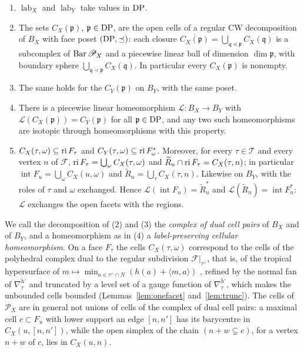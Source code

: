 \begin{proposition}\label{prop:L1}
\begin{enumerate}
\item $\operatorname{lab}_X$ and $\operatorname{lab}_Y$ take values in $\mathrm{DP}$.
\item The sets $C_X({\mathfrak p})$, ${\mathfrak p}\in\mathrm{DP}$, are the open cells of a regular CW decomposition of $B_X$ with face poset
$(\mathrm{DP},\preceq)$: each closure $\overline{C_X({\mathfrak p})}=\bigcup_{{\mathfrak q}\preceq {\mathfrak p}}C_X({\mathfrak q})$ is a subcomplex of $\operatorname{Bar}\mathscr P_X$ and a
piecewise linear ball of dimension $\dim{\mathfrak p}$, with boundary sphere $\bigcup_{{\mathfrak q}\prec {\mathfrak p}}C_X({\mathfrak q})$. In particular every $C_X({\mathfrak p})$ is
nonempty.
\item The same holds for the $C_Y({\mathfrak p})$ on $B_Y$, with the same poset.
\item There is a piecewise linear homeomorphism $\mathcal L\colon B_X\to B_Y$ with $\mathcal L(C_X({\mathfrak p}))=C_Y({\mathfrak p})$ for all
${\mathfrak p}\in\mathrm{DP}$, and any two such homeomorphisms are isotopic through homeomorphisms with this property.
\item $C_X(\tau,\omega)\subseteq\operatorname{ri} F_\tau$ and $C_Y(\tau,\omega)\subseteq\operatorname{ri} F^*_\omega$. Moreover, for every
$\tau\in\mathcal T$ and every vertex $n$ of $\mathcal F$, $\operatorname{ri} F_\tau=\bigcup_\omega C_X(\tau,\omega)$ and $\widetilde
R_n\cap\operatorname{ri} F_\tau=C_X(\tau,n)$; in particular $\operatorname{int}F_u=\bigcup_\omega C_X(u,\omega)$ and $\widetilde
R_n=\bigcup_\tau C_X(\tau,n)$. Likewise on $B_Y$, with the roles of $\tau$ and $\omega$ exchanged. Hence
$\mathcal L(\operatorname{int}F_u)=\widetilde R^*_u$ and $\mathcal L(\widetilde R_n)=\operatorname{int}F^*_n$:
$\mathcal L$ exchanges the open facets with the regions.
\end{enumerate}
\end{proposition}
We call the decomposition of (2) and (3) the \emph{complex of dual cell pairs} of $B_X$ and of $B_Y$, and a homeomorphism as in
(4) a \emph{label-preserving cellular homeomorphism}. On a face $F_\tau$ the cells $C_X(\tau,\omega)$ correspond to the cells of the polyhedral
complex dual to the regular subdivision $\mathcal F|_{\tau^\vee}$, that is, of the tropical hypersurface of
$m\mapsto\min_{a\in\tau^\vee\cap N}(h(a)+\langle m,a\rangle)$ \cite[\S3.1]{MS}, refined by the normal fan of
$\nabla^{\check h'}_\tau$ and truncated by a level set of a gauge function of $\nabla^{\check h'}_\tau$, which makes the
unbounded cells bounded (Lemmas~\ref{lem:onefacet} and~\ref{lem:trunc}). The cells of $\mathscr P_X$ are in general not
unions of cells of the complex of dual cell pairs: a maximal cell $c\subset F_u$ with lower support an edge $[n,n']$ has its
barycentre in $C_X(u,[n,n'])$, while the open simplex of the chain $(n+w\subsetneq c)$, for a vertex $n+w$ of $c$, lies in
$C_X(u,n)$.


